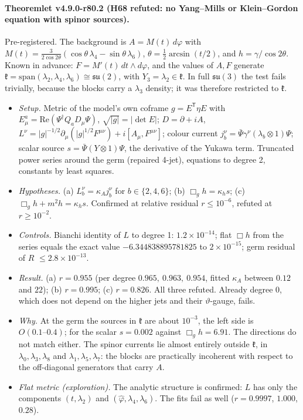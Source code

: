 \paragraph{Theoremlet v4.9.0-r80.2 (H68 refuted: no Yang--Mills or Klein--Gordon equation with spinor sources).}
Pre-registered.  The background is \(A=M(t)\,d\varphi\) with
\(M(t)=\tfrac{3}{2\cos2\theta}(\cos\theta\,\lambda_4-\sin\theta\,\lambda_6)\), \(\theta=\tfrac12\arcsin(t/2)\), and
\(h=\gamma/\cos2\theta\).  Known in advance: \(F=M'(t)\,dt\wedge d\varphi\), and the values of \(A,F\) generate
\(\mathfrak k=\mathrm{span}(\lambda_2,\lambda_4,\lambda_6)\cong\mathfrak{su}(2)\), with \(Y_3=\lambda_2\in\mathfrak k\).  In full
\(\mathfrak{su}(3)\) the test fails trivially, because the blocks carry a \(\lambda_3\) density; it was therefore restricted to
\(\mathfrak k\).
\begin{itemize}[leftmargin=2em]
\item \emph{Setup.}  Metric of the model's own coframe \(g=E^{\mathsf T}\eta E\) with \(E^a_\mu=\mathrm{Re}(\Psi^\dagger Q_aD_\mu\Psi)\),
\(\sqrt{|g|}=|\det E|\); \(D=\partial+iA\),
\(L^\nu=|g|^{-1/2}\partial_\mu(|g|^{1/2}F^{\mu\nu})+i[A_\mu,F^{\mu\nu}]\); colour current
\(j^\nu_b=\bar\Psi\gamma^\nu(\lambda_b\otimes1)\Psi\); scalar source \(s=\bar\Psi(Y\otimes1)\Psi\), the derivative of the Yukawa
term.  Truncated power series around the germ (repaired 4-jet), equations to degree 2, constants by least squares.
\item \emph{Hypotheses.}  (a) \(L^\nu_b=\kappa_Aj^\nu_b\) for \(b\in\{2,4,6\}\); (b) \(\Box_gh=\kappa_hs\); (c) \(\Box_gh+m^2h=\kappa_hs\).
Confirmed at relative residual \(r\le10^{-6}\), refuted at \(r\ge10^{-2}\).
\item \emph{Controls.}  Bianchi identity of \(L\) to degree 1: \(1.2\times10^{-14}\); flat \(\Box h\) from the series equals the
exact value \(-6.344838895781825\) to \(2\times10^{-15}\); germ residual of \(R\) \(\le2.8\times10^{-13}\).
\item \emph{Result.}  (a) \(r=0.955\) (per degree \(0.965,\ 0.963,\ 0.954\), fitted \(\kappa_A\) between \(0.12\) and \(22\));
(b) \(r=0.995\); (c) \(r=0.826\).  All three refuted.  Already degree 0, which does not depend on the higher jets and their
\(\vartheta\)-gauge, fails.
\item \emph{Why.}  At the germ the sources in \(\mathfrak k\) are about \(10^{-3}\), the left side is \(O(0.1\text{--}0.4)\); for
the scalar \(s=0.002\) against \(\Box_gh=6.91\).  The directions do not match either.  The spinor currents lie almost entirely
outside \(\mathfrak k\), in \(\lambda_0,\lambda_3,\lambda_8\) and \(\lambda_1,\lambda_5,\lambda_7\): the blocks are practically
incoherent with respect to the off-diagonal generators that carry \(A\).
\item \emph{Flat metric (exploration).}  The analytic structure is confirmed: \(L\) has only the components \((t,\lambda_2)\) and
\((\hat\varphi,\lambda_4,\lambda_6)\).  The fits fail as well (\(r=0.9997\), \(1.000\), \(0.28\)).
\end{itemize}

